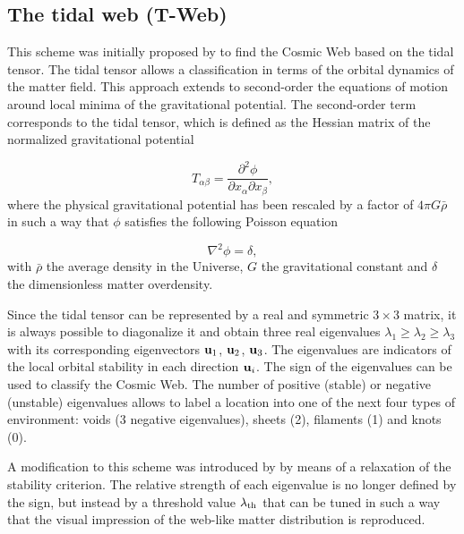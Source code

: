 \documentclass[a4,useAMS,usenatbib,usegraphicx]{mn2e}
\newcommand{\eq}[2]{\begin{equation} \label{eq:#1} #2 \end{equation}}
\begin{document}
\subsection{The tidal web (T-Web)}
\label{subsec:Tweb}

This scheme was initially proposed by \citet{Hahn07}  to find the
Cosmic Web based on the tidal tensor. 
The tidal tensor allows a classification in terms of the orbital
dynamics of the matter field.
This approach extends to second-order the equations of motion around 
local minima of the gravitational potential. 
The second-order term corresponds to the tidal tensor, which is
defined as the Hessian matrix of the normalized gravitational
potential


\eq{V_web}
{	T_{\alpha\beta} = \frac{\partial^2\phi}{\partial x_{\alpha}\partial x_{\beta}},	}
where the physical gravitational potential has been rescaled by a
factor of   $4\pi G\bar{\rho}$ in such a way that $\phi$ satisfies the following 
Poisson equation

\eq{Poisson}
{	\nabla^2\phi = \delta,	}
with $\bar{\rho}$ the average density in the Universe, $G$ the 
gravitational constant and $\delta$ the dimensionless matter
overdensity. 


Since the tidal tensor can be represented by a real and  symmetric
$3\times 3$ matrix, it is always possible to diagonalize  
it and obtain three real eigenvalues $\lambda_{1}\geq\lambda_{2}\geq
\lambda_3$ with its corresponding eigenvectors ${\bf u}_{1}$, ${\bf u}_{2}$,
${\bf u}_{3}$. 
The eigenvalues are indicators of the local  orbital stability
in each direction ${\bf u}_i$. 
The sign of the eigenvalues can be used to classify the Cosmic Web.
The number of positive (stable) or negative (unstable) eigenvalues allows 
to label a location into one of the next four types of environment: 
voids (3 negative eigenvalues), sheets (2), filaments (1) and knots (0). 


A modification to this scheme was introduced by \citet{Forero09}
by means of a relaxation of the stability criterion. 
The relative strength  of each eigenvalue is no longer defined by the
sign, but instead by a threshold value $\lambda_{\rm th}$ that can be
tuned in such a way that the visual impression of the web-like matter
distribution is reproduced. 
 
\end{document}
